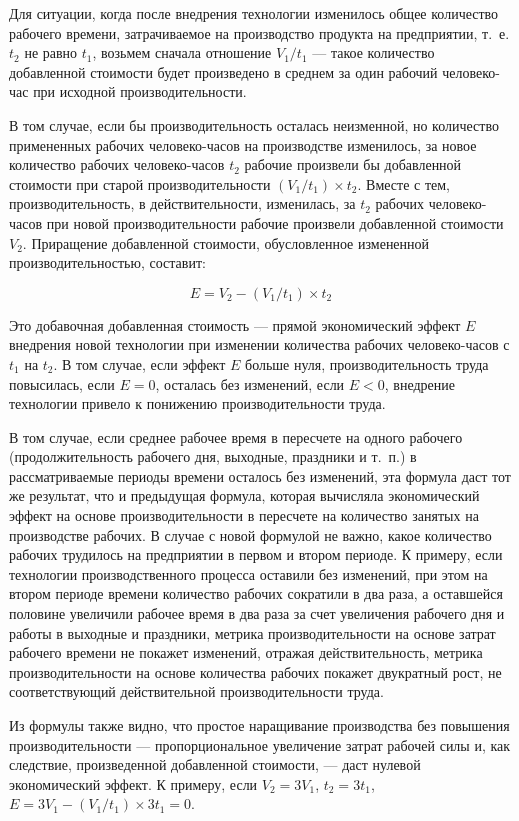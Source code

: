 \documentclass{article}
\begin{document}
Для ситуации, когда после внедрения технологии изменилось общее количество рабочего времени, затрачиваемое на производство продукта на предприятии, т.~е. $t_2$ не равно $t_1$, возьмем сначала отношение $V_1 / t_1$ — такое количество добавленной стоимости будет произведено в среднем за один рабочий человеко-час при исходной производительности.

В том случае, если бы производительность осталась неизменной, но количество примененных рабочих человеко-часов на производстве изменилось, за новое количество рабочих человеко-часов $t_2$ рабочие произвели бы добавленной стоимости при старой производительности $(V_1 / t_1) \times t_2$. Вместе с тем, производительность, в действительности, изменилась, за $t_2$ рабочих человеко-часов при новой производительности рабочие произвели добавленной стоимости $V_2$. Приращение добавленной стоимости, обусловленное измененной производительностью, составит:

$$E = V_2 - (V_1 / t_1) \times t_2$$

Это добавочная добавленная стоимость — прямой экономический эффект $E$ внедрения новой технологии при изменении количества рабочих человеко-часов с $t_1$ на $t_2$. В том случае, если эффект $E$ больше нуля, производительность труда повысилась, если $E = 0$, осталась без изменений, если $E < 0$, внедрение технологии привело к понижению производительности труда.

В том случае, если среднее рабочее время в пересчете на одного рабочего (продолжительность рабочего дня, выходные, праздники и т.~п.) в рассматриваемые периоды времени осталось без изменений, эта формула даст тот же результат, что и предыдущая формула, которая вычисляла экономический эффект на основе производительности в пересчете на количество занятых на производстве рабочих. В случае с новой формулой не важно, какое количество рабочих трудилось на предприятии в первом и втором периоде. К примеру, если технологии производственного процесса оставили без изменений, при этом на втором периоде времени количество рабочих сократили в два раза, а оставшейся половине увеличили рабочее время в два раза за счет увеличения рабочего дня и работы в выходные и праздники, метрика производительности на основе затрат рабочего времени не покажет изменений, отражая действительность, метрика производительности на основе количества рабочих покажет двукратный рост, не соответствующий действительной производительности труда.

Из формулы также видно, что простое наращивание производства без повышения производительности — пропорциональное увеличение затрат рабочей силы и, как следствие, произведенной добавленной стоимости, — даст нулевой экономический эффект. К примеру, если $V_2 = 3V_1$, $t_2 = 3t_1$, $E = 3V_1 - (V_1 / t_1) \times 3t_1 = 0$.
\end{document}

